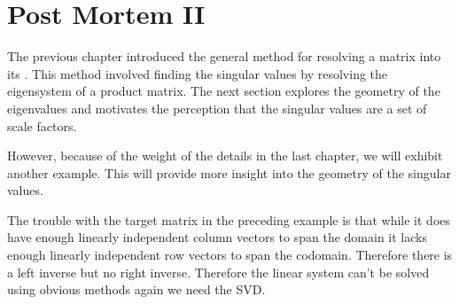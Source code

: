 \chapter{Post Mortem II}

The previous chapter introduced the general method for resolving a matrix into its \svdl. This method involved finding the singular values by resolving the eigensystem of a product matrix. The next section explores the geometry of the eigenvalues and motivates the perception that the singular values are a set of scale factors.

However, because of the weight of the details in the last chapter, we will exhibit another example. This will provide more insight into the geometry of the singular values.

The trouble with the target matrix in the preceding example is that while it does have enough linearly independent column vectors to span the domain it lacks enough linearly independent row vectors to span the codomain. Therefore there is a left inverse but no right inverse. Therefore the linear system can't be solved using obvious methods again we need the SVD.
 



\endinput